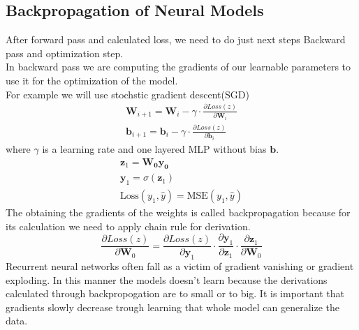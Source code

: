 \subsection{Backpropagation of Neural Models}
After forward pass and calculated loss, we need to do just next steps Backward pass and optimization step.\\In backward pass we are computing the gradients of our learnable parameters to use it for the optimization of the model.\\
For example we will use stochstic gradient descent(SGD)
\begin{eqnarray}
	\mathbf{W}_{i+1} = \mathbf{W}_i - \gamma\cdot \frac{\partial Loss(z)}{\partial \mathbf{W}_i }\\
	\mathbf{b}_{i+1} = \mathbf{b}_i - \gamma\cdot \frac{\partial Loss(z)}{\partial \mathbf{b}_i }
\end{eqnarray} where $\gamma$ is a learning rate and one layered MLP
without bias $\mathbf{b}$.
\begin{eqnarray}
	\mathbf{z}_1 = \mathbf{W_0}\mathbf{y_0}\\ 
	\mathbf{y}_1 = \sigma(\mathbf{z}_1)\\
	\text{Loss}(y_1,\hat{y}) = \text{MSE}(y_1,\hat{y})
\end{eqnarray}
The obtaining the gradients of the weights is called backpropagation because for its calculation we need to apply chain rule for derivation.
\begin{equation}
\frac{\partial Loss(z)}{\partial \mathbf{W}_0}= \frac{\partial Loss(z)}{\partial \mathbf{y}_1} \cdot\frac{\partial \mathbf{y}_1}{\partial \mathbf{z}_1}\cdot	\frac{\partial \mathbf{z}_1}{\partial \mathbf{W}_0}
\end{equation}
Recurrent neural networks often fall as a victim of gradient vanishing or gradient exploding. In this manner the models doesn’t learn because the derivations calculated through backpropogation are to small or to big. It is important that gradients slowly decrease trough learning that whole model can generalize the data.
